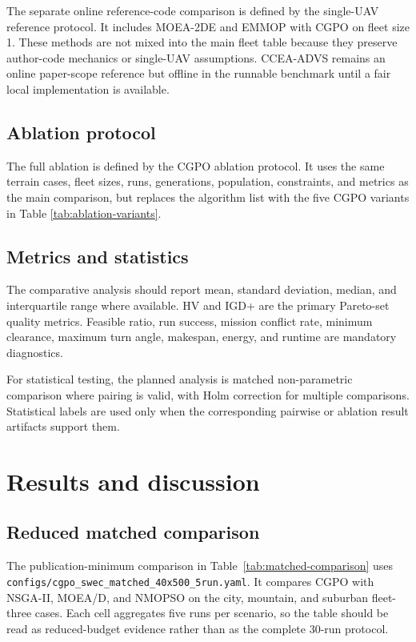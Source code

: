 \documentclass[a4paper,fleqn]{cas-dc}
\begin{document}
The separate online reference-code comparison is defined by the single-UAV reference protocol. It includes MOEA-2DE and EMMOP with CGPO on fleet size 1. These methods are not mixed into the main fleet table because they preserve author-code mechanics or single-UAV assumptions. CCEA-ADVS remains an online paper-scope reference but offline in the runnable benchmark until a fair local implementation is available.

\subsection{Ablation protocol}

The full ablation is defined by the CGPO ablation protocol. It uses the same terrain cases, fleet sizes, runs, generations, population, constraints, and metrics as the main comparison, but replaces the algorithm list with the five CGPO variants in Table \ref{tab:ablation-variants}.

\subsection{Metrics and statistics}

The comparative analysis should report mean, standard deviation, median, and interquartile range where available. HV and IGD+ are the primary Pareto-set quality metrics. Feasible ratio, run success, mission conflict rate, minimum clearance, maximum turn angle, makespan, energy, and runtime are mandatory diagnostics.

For statistical testing, the planned analysis is matched non-parametric comparison where pairing is valid, with Holm correction for multiple comparisons. Statistical labels are used only when the corresponding pairwise or ablation result artifacts support them.

\section{Results and discussion}
\label{sec:results}

\subsection{Reduced matched comparison}

The publication-minimum comparison in Table~\ref{tab:matched-comparison} uses \texttt{configs/cgpo\_swec\_matched\_40x500\_5run.yaml}. It compares CGPO with NSGA-II, MOEA/D, and NMOPSO on the city, mountain, and suburban fleet-three cases. Each cell aggregates five runs per scenario, so the table should be read as reduced-budget evidence rather than as the complete 30-run protocol.
\end{document}
